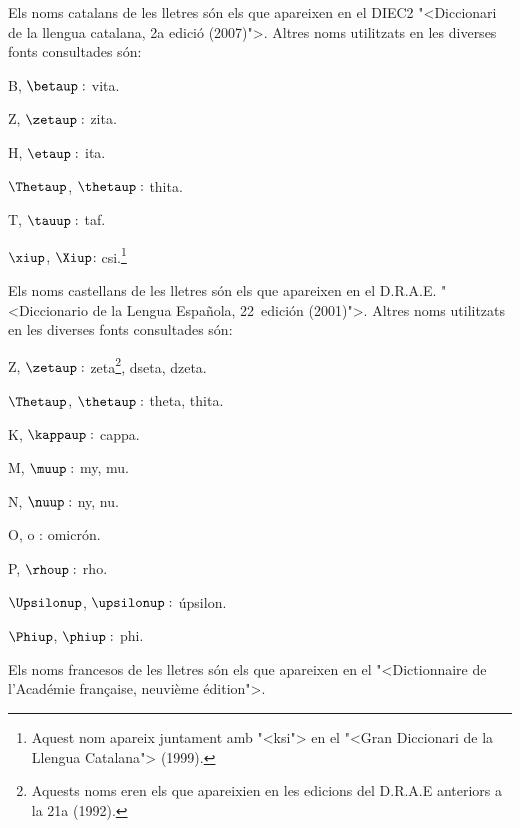Els noms catalans de les lletres s\'{o}n els que apareixen en el DIEC2 {"<}Diccionari de la llengua catalana, 2a edici\'{o} (2007){">}. Altres noms utilitzats en
les diverses fonts consultades s\'{o}n:
\begin{multicols}{3}
\begin{list}{}
   {\setlength{\labelwidth}{16mm} \setlength{\leftmargin}{16mm} \setlength{\labelsep}{2mm}}
   \item[B, $\betaup :$] vita.
   \item[Z, $\zetaup :$] zita.
   \item[H, $\etaup :$] ita.
   \item[$\Thetaup$, $\thetaup :$] thita.
   \item[T, $\tauup :$] taf.
   \item[$\xiup$, $\Xiup$:] csi.\footnote{Aquest nom apareix juntament amb {"<}ksi{">} en el {"<}Gran Diccionari de la Llengua Catalana{">} (1999).}
\end{list}
\end{multicols}

Els noms castellans de les lletres s\'{o}n els que apareixen en el D.R.A.E.
{"<}Diccionario de la Lengua Espa\~{n}ola, 22\textordfeminine\
edici\'{o}n (2001){">}. Altres noms utilitzats en les diverses fonts
consultades s\'{o}n:
\begin{multicols}{3}
\begin{list}{}
   {\setlength{\labelwidth}{16mm} \setlength{\leftmargin}{16mm} \setlength{\labelsep}{2mm}}
   \item[Z, $\zetaup :$] zeta\footnote{Aquests noms eren els que apareixien en les edicions
   del D.R.A.E anteriors a la 21a (1992).}, dseta, dzeta.
   \item[$\Thetaup$, $\thetaup :$] theta\footnotemark[2], thita.
   \item[K, $\kappaup :$] cappa.
   \item[M, $\muup :$] my\footnotemark[2], mu.
   \item[N, $\nuup :$] ny\footnotemark[2], nu.
   \item[O, o :] omicr\'{o}n.
   \item[P, $\rhoup :$] rho.
   \item[$\Upsilonup$, $\upsilonup :$] \'{u}psilon.
   \item[$\Phiup$, $\phiup :$] phi.
\end{list}
\end{multicols}

Els noms francesos de les lletres s\'{o}n els que apareixen en el {"<}Dictionnaire de l'Acad\'{e}mie fran\c{c}aise, neuvi\`{e}me \'{e}dition{">}. 
